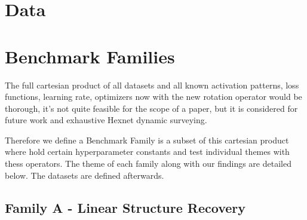 \section{Data}


\section{Benchmark Families}

The full cartesian product of all datasets and all known activation patterns, loss functions, learning rate, optimizers now with the new rotation operator would be thorough, it's not quite feasible for the scope of a paper, but it is considered for future work and exhaustive Hexnet dynamic surveying.

Therefore we define a Benchmark Family is a subset of this cartesian product where hold certain hyperparameter constants and test individual themes with thess operators.
The theme of each family along with our findings are detailed below. The datasets are defined afterwards.


\subsection{Family A - Linear Structure Recovery}


